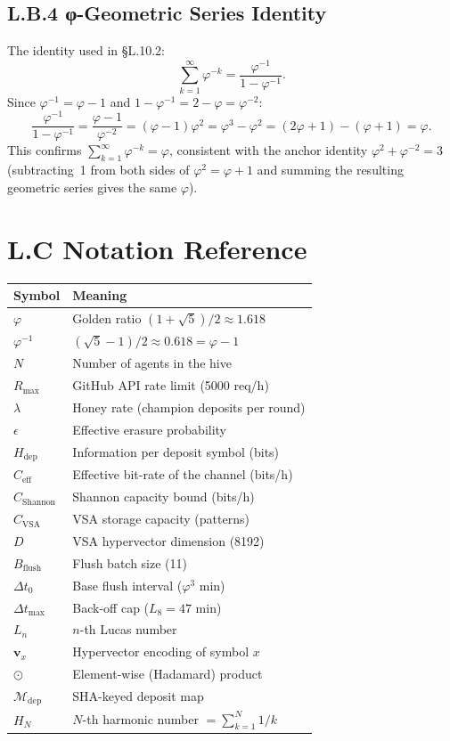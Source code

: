 \subsection*{L.B.4 \quad φ-Geometric Series Identity}

The identity used in §L.10.2:
\[
  \sum_{k=1}^{\infty} \varphi^{-k} = \frac{\varphi^{-1}}{1 - \varphi^{-1}}.
\]
Since $\varphi^{-1} = \varphi - 1$ and $1 - \varphi^{-1} = 2 - \varphi
= \varphi^{-2}$:
\[
  \frac{\varphi^{-1}}{1-\varphi^{-1}} = \frac{\varphi-1}{\varphi^{-2}}
  = (\varphi-1)\varphi^{2} = \varphi^{3} - \varphi^{2}
  = (2\varphi+1) - (\varphi+1) = \varphi.
\]
This confirms $\sum_{k=1}^{\infty}\varphi^{-k} = \varphi$, consistent
with the anchor identity $\varphi^{2}+\varphi^{-2}=3$ (subtracting~1
from both sides of $\varphi^{2} = \varphi + 1$ and summing the
resulting geometric series gives the same $\varphi$).

\section*{L.C \quad Notation Reference}
\label{sec:appl-notation}

\begin{tabular}{ll}
\hline
\textbf{Symbol} & \textbf{Meaning} \\
\hline
$\varphi$ & Golden ratio $(1+\sqrt{5})/2 \approx 1.618$ \\
$\varphi^{-1}$ & $(\sqrt{5}-1)/2 \approx 0.618 = \varphi - 1$ \\
$N$ & Number of agents in the hive \\
$R_{\max}$ & GitHub API rate limit (5000 req/h) \\
$\lambda$ & Honey rate (champion deposits per round) \\
$\epsilon$ & Effective erasure probability \\
$H_{\text{dep}}$ & Information per deposit symbol (bits) \\
$C_{\text{eff}}$ & Effective bit-rate of the channel (bits/h) \\
$C_{\text{Shannon}}$ & Shannon capacity bound (bits/h) \\
$C_{\text{VSA}}$ & VSA storage capacity (patterns) \\
$D$ & VSA hypervector dimension (8192) \\
$B_{\text{flush}}$ & Flush batch size (11) \\
$\Delta t_{0}$ & Base flush interval ($\varphi^{3}$ min) \\
$\Delta t_{\max}$ & Back-off cap ($L_{8} = 47$ min) \\
$L_n$ & $n$-th Lucas number \\
$\mathbf{v}_x$ & Hypervector encoding of symbol $x$ \\
$\odot$ & Element-wise (Hadamard) product \\
$\mathcal{M}_{\text{dep}}$ & SHA-keyed deposit map \\
$H_N$ & $N$-th harmonic number $= \sum_{k=1}^N 1/k$ \\
\hline
\end{tabular}

